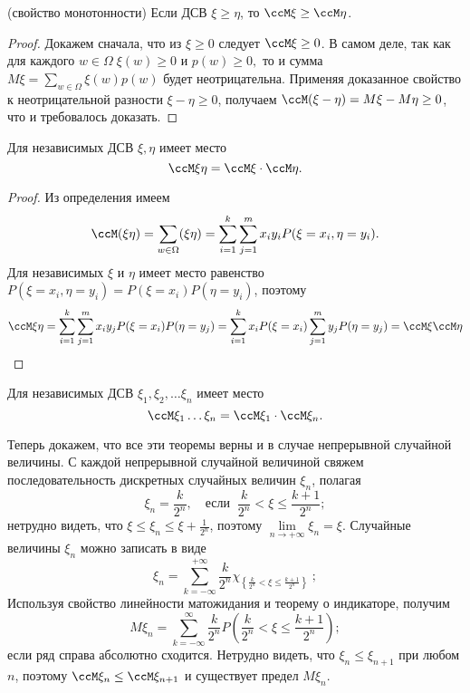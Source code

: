 \begin{thm}(свойство монотонности) Если ДСВ $\xi\ge\eta$, то $\ccM\xi\ge\ccM\eta$.
\end{thm}
\begin{proof}
Докажем сначала, что из $\xi \ge 0$ следует $\ccM\xi\ge0$. В самом деле, так как для каждого $w\in\Omega\; \xi(w)\ge0$ и $p(w)\ge0,$ то и сумма $M\xi=\sum\limits_{w\in\Omega}\xi(w)p(w)$ будет неотрицательна. Применяя доказанное свойство к неотрицательной разности $\xi-\eta\ge0$, получаем $\ccM(\xi-\eta)=M\xi-M\eta\ge0$, что и требовалось доказать.
\end{proof}

\begin{thm}
Для независимых ДСВ $\xi,\eta$ имеет место
$$
\ccM \xi\eta=\ccM\xi\cdot\ccM\eta.
$$
\end{thm}
\begin{proof}
Из определения имеем
$$
\ccM (\xi\eta)=\sum\limits_{w\in\Omega}(\xi\eta)=\sum\limits_{i=1}^{k}\sum\limits^{m}_{j=1}x_i y_i P(\xi=x_i, \eta=y_i).
$$
Для независимых $\xi$ и $\eta$ имеет место равенство $P(\xi=x_i, \eta=y_i)=P(\xi=x_i)P(\eta=y_i)$, поэтому 
$$
\ccM\xi\eta=\sum\limits_{i=1}^{k}\sum\limits^{m}_{j=1}x_i y_j P(\xi=x_i)P( \eta=y_j)=\sum\limits_{i=1}^{k} x_i P(\xi=x_i)\sum\limits^{m}_{j=1} y_j P( \eta=y_j)=\ccM\xi\ccM\eta
$$
\end{proof}
\begin{cons}
Для независимых ДСВ $\xi_1,\xi_2,\dots \xi_n$ имеет место
$$
\ccM \xi_1\dots\xi_n=\ccM\xi_1\cdot\ccM\xi_n.
$$
\end{cons}

Теперь докажем, что все эти теоремы верны и в случае непрерывной случайной величины. С каждой непрерывной случайной величиной свяжем последовательность дискретных случайных величин $\xi_n$, полагая 
$$
\xi_n=\frac{k}{2^n}, \quad \text{если} \;\; \frac{k}{2^n}<\xi\le\frac{k+1}{2^n};
$$
нетрудно видеть, что $\xi\le\xi_n\le\xi+\frac{1}{2^n}$, поэтому $\lim\limits_{n\to +\infty}\xi_n=\xi$. Случайные величины $\xi_n$ можно записать в виде
$$
\xi_n = \sum_{k=-\infty}^{+\infty}\frac{k}{2^n} \chi_{\textstyle\left\{ \frac{k}{2^n}<\xi\le\frac{k+1}{2^n}\right\}}\; ;
$$
Используя свойство линейности матожидания и теорему о индикаторе, получим
\begin{equation} \label{teorver11}
M\xi_n=\sum\limits^{\infty}_{k=-\infty} \frac{k}{2^n}P\left(\frac{k}{2^n}<\xi \le\frac{k+1}{2^n}\right);
\end{equation}
если ряд справа абсолютно сходится. Нетрудно видеть, что $\xi_n\le\xi_{n+1}$ при любом $n$, поэтому $\ccM\xi_n\le\ccM\xi_{n+1}$ и существует предел $M\xi_n$.

